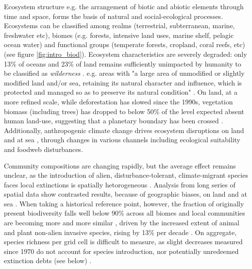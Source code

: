 Ecosystem structure e.g. the arrangement of biotic and abiotic elements through time and space, forms the basis of natural and social-ecological processes. Ecosystems can be classified among realms (terrestrial, subterranean, marine, freshwater etc), biomes (e.g. forests, intensive land uses, marine shelf, pelagic ocean water) and functional groups (temperate forests, cropland, coral reefs, etc) (see figure \ref{fig:intro_biod}). Ecosystem characteristics are severely degraded: only 13\% of oceans and 23\% of land remains sufficiently unimpacted by humanity to be classified as \textit{wilderness} \citep{watson_2016_catastrophic, jones_2018_location}. e.g. areas with "a large area of unmodified or slightly modified land and/or sea, retaining its natural character and influence, which is protected and managed so as to preserve its natural condition" \citep{dudley2008guidelines}.
 On land, at a more refined scale, while deforestation has slowed since the 1990s, vegetation biomass (including trees) has dropped to below 50\% of the level expected absent human land-use, suggesting that a planetary boundary has been crossed \citep{steffen_2015_planetary}. Additionally, anthropogenic climate change drives ecosystem disruptions on land \citep{burrell_anthropogenic_2020, conradi_reassessment_2024} and at sea \citep{gomes_marine_2024}, through changes in various channels including ecological suitability and foodweb disturbances.

Community compositions are changing rapidly, but the average effect remains unclear, as the introduction of alien, disturbance-tolerant, climate-migrant species faces local extinctions is spatially hetorogeneous \citep{cardinale_local_2018}. Analysis from long series of spatial data show contrasted results, because of geographic biases, on land and at sea \citep{dornelas_assemblage_2014, gonzales_estimating_2016}. When taking a historical reference point, however, the fraction of originally present biodiversity falls well below 90\% across all biomes \citep{Hill311787} and local communities are becoming more and more similar \citep{mckinney_1999_biotic}, driven by the increased extent of animal and plant non-alien invasive species, rising by 13\% per decade \citep{seebens_no_2017}. On aggregate, species richness per grid cell is difficult to measure, as slight decreases measured since 1970 \citep{Kim300632} do not account for species introduction, nor potentially unredeemed extinction debts (see below) \citep{JACKSON2010153}.

